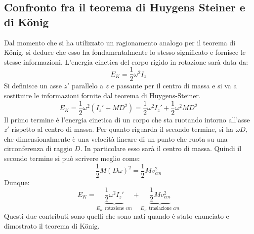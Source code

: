 \documentclass[10pt,a4paper]{book}
\begin{document}
\subsection{Confronto fra il teorema di Huygens Steiner e di K\"onig}

Dal momento che si ha utilizzato un ragionamento analogo per il teorema di K\"onig, si deduce che esso ha fondamentalmente lo stesso significato e fornisce le stesse informazioni. L'energia cinetica del corpo rigido in rotazione sarà data da:
\[
	E_K = \frac{1}{2} \omega^2 I_z
\]
Si definisce un asse $z'$ parallelo a $z$ e passante per il centro di massa e si va a sostituire le informazioni fornite dal teorema di Huygens-Steiner.
\[
	E_K = \frac{1}{2} \omega^2 (I_z' + MD^2) = \frac{1}{2} \omega^2 I_z' + \frac{1}{2} \omega^2 MD^2
\]
Il primo termine è l'energia cinetica di un corpo che sta ruotando intorno all'asse $z'$ rispetto al centro di massa. Per quanto riguarda il secondo termine, si ha $\omega D$, che dimensionalmente è una velocità lineare di un punto che ruota su una circonferenza di raggio $D$. In particolare esso sarà il centro di massa. Quindi il secondo termine si può scrivere meglio come:
\[
	\frac{1}{2} M(D\omega)^2 = \frac{1}{2} Mv_{cm}^2
\]
Dunque:
\[
	E_K = \underbrace{\frac{1}{2} \omega^2 I_z'}_{E_K\text{ rotazione }cm  } + \underbrace{\frac{1}{2} Mv_{cm}^2}_{E_K\text{ traslazione } cm }
\]
Questi due contributi sono quelli che sono nati quando è stato enunciato e dimostrato il teorema di K\"onig.
\end{document}
